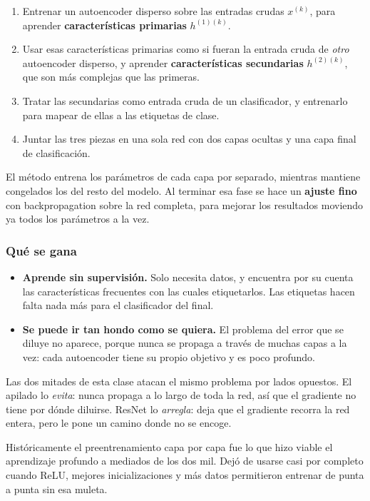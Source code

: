 \documentclass[11pt,letterpaper]{article}
\begin{document}
\begin{enumerate}[itemsep=0.4em]
  \item Entrenar un autoencoder disperso sobre las entradas crudas
        $x^{(k)}$, para aprender \textbf{características primarias}
        $h^{(1)(k)}$.
  \item Usar esas características primarias como si fueran la entrada
        cruda de \emph{otro} autoencoder disperso, y aprender
        \textbf{características secundarias} $h^{(2)(k)}$, que son más
        complejas que las primeras.
  \item Tratar las secundarias como entrada cruda de un clasificador,
        y entrenarlo para mapear de ellas a las etiquetas de clase.
  \item Juntar las tres piezas en una sola red con dos capas ocultas y
        una capa final de clasificación.
\end{enumerate}

El método entrena los parámetros de cada capa por separado, mientras
mantiene congelados los del resto del modelo. Al terminar esa fase se
hace un \textbf{ajuste fino} con backpropagation sobre la red
completa, para mejorar los resultados moviendo ya todos los
parámetros a la vez.

\subsubsection*{Qué se gana}

\begin{itemize}[itemsep=0.3em]
  \item \textbf{Aprende sin supervisión.} Solo necesita datos, y
        encuentra por su cuenta las características frecuentes con las
        cuales etiquetarlos. Las etiquetas hacen falta nada más para
        el clasificador del final.
  \item \textbf{Se puede ir tan hondo como se quiera.} El problema del
        error que se diluye no aparece, porque nunca se propaga a
        través de muchas capas a la vez: cada autoencoder tiene su
        propio objetivo y es poco profundo.
\end{itemize}

\begin{idea}
  Las dos mitades de esta clase atacan el mismo problema por lados
  opuestos. El apilado lo \emph{evita}: nunca propaga a lo largo de
  toda la red, así que el gradiente no tiene por dónde diluirse.
  ResNet lo \emph{arregla}: deja que el gradiente recorra la red
  entera, pero le pone un camino donde no se encoge.

  Históricamente el preentrenamiento capa por capa fue lo que hizo
  viable el aprendizaje profundo a mediados de los dos mil. Dejó de
  usarse casi por completo cuando ReLU, mejores inicializaciones y más
  datos permitieron entrenar de punta a punta sin esa muleta.
\end{idea}
\end{document}
